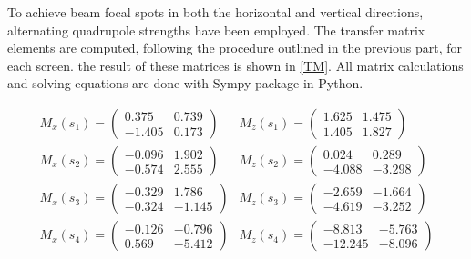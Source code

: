 \documentclass[12pt]{article}
\begin{document}
To achieve beam focal spots in both the horizontal and vertical directions, alternating quadrupole strengths have been employed. The transfer matrix elements are computed, following the procedure outlined in the previous part, for each screen. the result of these matrices is shown in \ref{TM}.
All matrix calculations and solving equations are done with Sympy package in Python.

\begin{equation}
\begin{array}{ll}

M_x\left(s_1\right)=\left(\begin{array}{cc}
0.375 & 0.739 \\
-1.405 & 0.173
\end{array}\right) & 

M_z\left(s_1\right)=\left(\begin{array}{cc}
1.625 & 1.475 \\
 1.405 & 1.827
\end{array}\right) \\


M_x\left(s_2\right)=\left(\begin{array}{ll}
 -0.096 & 1.902 \\
 -0.574 & 2.555
\end{array}\right) & 

M_z\left(s_2\right)=\left(\begin{array}{cc}
 0.024  & 0.289  \\
 -4.088 & -3.298
\end{array}\right) \\


M_x\left(s_3\right)=\left(\begin{array}{cc}
 -0.329  & 1.786 \\
 -0.324 & -1.145
\end{array}\right) & 

M_z\left(s_3\right)=\left(\begin{array}{cc}
 -2.659 & -1.664 \\
 -4.619 &  -3.252
\end{array}\right) \\


M_x\left(s_4\right)=\left(\begin{array}{cc}
 -0.126 & -0.796 \\
 0.569 & -5.412
\end{array}\right) &

M_z\left(s_4\right)=\left(\begin{array}{cc}
 -8.813 & -5.763 \\
 -12.245 & -8.096
\end{array}\right)
\end{array}
\label{TM}
\end{equation}
\end{document}
